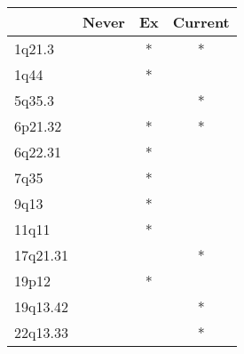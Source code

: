 \begin{tabular}{lccc}
\toprule
{} & Never & Ex & Current \\
\midrule
1q21.3   &       &  * &       * \\
1q44     &       &  * &         \\
5q35.3   &       &    &       * \\
6p21.32  &       &  * &       * \\
6q22.31  &       &  * &         \\
7q35     &       &  * &         \\
9q13     &       &  * &         \\
11q11    &       &  * &         \\
17q21.31 &       &    &       * \\
19p12    &       &  * &         \\
19q13.42 &       &    &       * \\
22q13.33 &       &    &       * \\
\bottomrule
\end{tabular}
